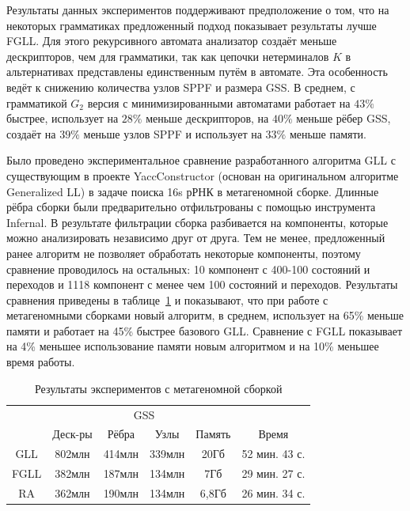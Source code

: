 Результаты данных экспериментов поддерживают предположение о том, что на некоторых грамматиках 
предложенный подход показывает результаты лучше FGLL.
Для этого рекурсивного автомата анализатор создаёт меньше дескрипторов, чем для грамматики, так как 
цепочки нетерминалов $K$ в альтернативах представлены единственным путём в автомате. Эта особенность ведёт к снижению количества 
узлов SPPF и размера GSS.
В среднем, с грамматикой $G_2$ версия с минимизированными автоматами работает на $43\%$ быстрее,
использует на $28\%$ меньше дескрипторов, на $40\%$ меньше рёбер GSS, создаёт на $39\%$ меньше узлов SPPF
и использует на $33\%$ меньше памяти.

Было проведено экспериментальное сравнение разработанного алгоритма GLL с
существующим в проекте YaccConstructor (основан на оригинальном алгоритме Generalized LL) в задаче поиска 16s рРНК в метагеномной сборке.
Длинные рёбра сборки были предварительно отфильтрованы с помощью инструмента Infernal.
В результате фильтрации сборка разбивается на компоненты, которые можно анализировать независимо друг от
друга. Тем не менее, предложенный ранее алгоритм не позволяет обработать некоторые компоненты, поэтому сравнение проводилось
на остальных: 10 компонент с 400-100 состояний и переходов и 1118 компонент с менее чем 100 состояний и переходов.
Результаты сравнения приведены в таблице~\ref{expTable1} и показывают, что при работе с метагеномными сборками новый
алгоритм, в среднем, использует на 65\% меньше памяти и работает на 45\% быстрее базового GLL. Сравнение с FGLL
показывает на 4\% меньшее использование памяти новым алгоритмом и на 10\% меньшее время работы.

\begin{table}
	\begin{center}
		\begin{tabular}{ | c | c | c | c | c | c |}
			\hline
			& &\multicolumn{2}{c|}{GSS} & & \\
			\cline{3-4}
			& Деск-ры & Рёбра   & Узлы   & Память& Время   \\ \hline
			GLL               &  802млн &  414млн & 339млн  & 20Гб & 52 мин. 43 с.  \\ \hline
			FGLL        &  382млн &  187млн & 134млн & 7Гб & 29 мин. 27 с.  \\ \hline
			RA                &  362млн &  190млн & 134млн & 6,8Гб & 26 мин. 34 с.  \\ \hline %
		\end{tabular}
		\caption{Результаты экспериментов с метагеномной сборкой}
		\label{expTable1}
	\end{center}
\end{table}

